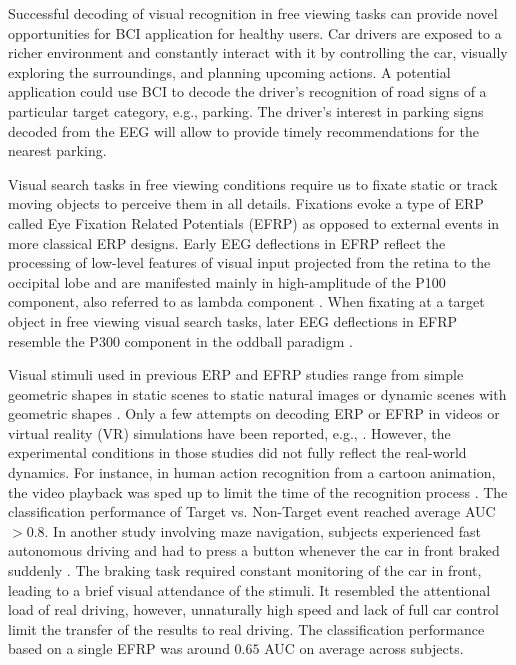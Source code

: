 \documentclass[12pt]{iopart}
\begin{document}
Successful decoding of visual recognition in free viewing tasks
can provide novel opportunities for BCI application for healthy users.
Car drivers are exposed to a richer environment and constantly interact with it
by controlling the car, visually exploring the surroundings, and
planning upcoming actions. 
A potential application could use BCI to decode
the driver's recognition of road signs of a particular target category, e.g., parking.
The driver's interest in parking signs decoded from the EEG
will allow to provide timely recommendations for the nearest parking.

Visual search tasks in free viewing conditions require us to fixate static or track moving objects to perceive them in all details. Fixations evoke a type of ERP called Eye Fixation Related Potentials (EFRP)
as opposed to external events in more classical ERP designs.
Early EEG deflections in EFRP reflect the processing of low-level features 
of visual input projected from the retina to the occipital lobe 
and are manifested mainly in high-amplitude 
of the P100 component, also referred to as lambda component \cite{evans_further_1952}.
When fixating at a target object in free viewing visual search tasks, later EEG deflections in EFRP resemble the P300 component in the oddball paradigm \cite{brouwer_distinguishing_2013,kaunitz_looking_2014,devillez_eye_2015}.

Visual stimuli used in previous ERP and EFRP studies range from simple geometric shapes
in static scenes to static natural images or dynamic
scenes with geometric shapes \cite{uscumlic_active_2016, devillez_p300_2015}.
Only a few attempts on decoding ERP or EFRP in videos or virtual reality (VR) simulations
have been reported, e.g., \cite{rosenthal_evoked_2014,jangraw_neurally_2014}. 
However, the experimental conditions in those studies did not fully
reflect the real-world dynamics.
For instance, in human action recognition from a cartoon animation, the video playback was sped up
to limit the time of the recognition process
\cite{rosenthal_evoked_2014}.
The classification performance of Target vs. Non-Target event reached average AUC $> 0.8$.
In another study involving maze navigation, subjects experienced fast autonomous driving
and had to press a button whenever the car in front braked suddenly \cite{jangraw_neurally_2014}.
The braking task required constant monitoring of the car in front, leading
to a brief visual attendance of the stimuli. It resembled the attentional load
of real driving, however, unnaturally high speed and lack of full car control
limit the transfer of the results to real driving.
The classification performance based on a single EFRP 
was around $0.65$ AUC on average across subjects.
\end{document}
